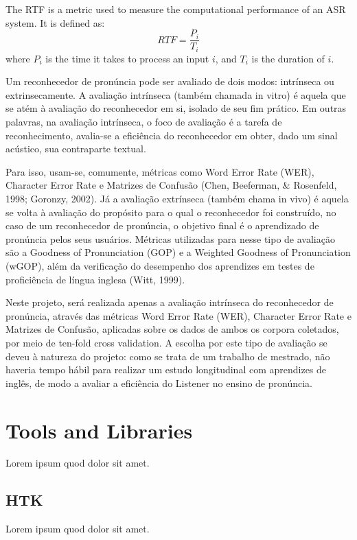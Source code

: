 The \ac{RTF} is a metric used to measure the computational performance of 
an \ac{ASR} system. It is defined as:
\begin{equation}
 \textit{RTF}=\frac{P_i}{T_i}
\end{equation}
where $P_i$ is the time it takes to process an input $i$, and $T_i$ is the duration of $i$.


Um reconhecedor de pron\'uncia pode ser avaliado de dois modos: intr\'inseca
ou extrinsecamente. A avalia\c{c}\~ao intr\'inseca (tamb\'em chamada in vitro) \'e
aquela que se at\'em à avalia\c{c}\~ao do reconhecedor em si, isolado de seu fim
pr\'atico. Em outras palavras, na avalia\c{c}\~ao intr\'inseca, o foco de
avalia\c{c}\~ao \'e a tarefa de reconhecimento, avalia-se a efici\^encia do
reconhecedor em obter, dado um sinal ac\'ustico, sua contraparte textual.

Para isso, usam-se, comumente, m\'etricas como Word Error Rate (WER),
Character Error Rate e Matrizes de Confus\~ao (Chen, Beeferman, \&
Rosenfeld, 1998; Goronzy, 2002). J\'a a avalia\c{c}\~ao extr\'inseca (tamb\'em chama
in vivo) \'e aquela se volta à avalia\c{c}\~ao do prop\'osito para o qual o
reconhecedor foi constru\'ido, no caso de um reconhecedor de pron\'uncia, o
objetivo final \'e o aprendizado de pron\'uncia pelos seus usu\'arios.
M\'etricas utilizadas para nesse tipo de avalia\c{c}\~ao s\~ao a Goodness of
Pronunciation (GOP) e a Weighted Goodness of Pronunciation (wGOP), al\'em
da verifica\c{c}\~ao do desempenho dos aprendizes em testes de profici\^encia de
l\'ingua inglesa (Witt, 1999).

Neste projeto, ser\'a realizada apenas a avalia\c{c}\~ao intr\'inseca do
reconhecedor de pron\'uncia, atrav\'es das m\'etricas Word Error Rate (WER),
Character Error Rate e Matrizes de Confus\~ao, aplicadas sobre os dados de
ambos os corpora coletados, por meio de ten-fold cross validation. A
escolha por este tipo de avalia\c{c}\~ao se deveu à natureza do projeto: como
se trata de um trabalho de mestrado, n\~ao haveria tempo h\'abil para
realizar um estudo longitudinal com aprendizes de ingl\^es, de modo a
avaliar a efici\^encia do Listener no ensino de pron\'uncia.

\section{Tools and Libraries}
Lorem ipsum quod dolor sit amet.

\subsection{HTK}
Lorem ipsum quod dolor sit amet.

